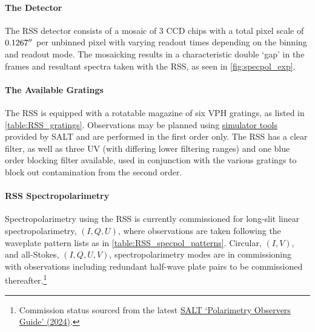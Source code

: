 \paragraph{The Detector}
The \gls{RSS} detector consists of a mosaic of 3 \gls{CCD} chips with a total pixel scale of $0.1267\hbox{$^{\prime\prime}$}$ per unbinned pixel with varying readout times depending on the binning and readout mode.
The mosaicking results in a characteristic double `gap' in the frames and resultant spectra taken with the \gls{RSS}, as seen in \autoref{fig:specpol_exp}.

\paragraph{The Available Gratings}
The \gls{RSS} is equipped with a rotatable magazine of six \gls{VPH} gratings, as listed in \autoref{table:RSS_gratings}.
Observations may be planned using \href{https://astronomers.salt.ac.za/software/}{simulator tools} provided by \gls{SALT} and are performed in the first order only.
The \gls{RSS} has a clear filter, as well as three \gls{UV} (with differing lower filtering ranges) and one blue order blocking filter available, used in conjunction with the various gratings to block out contamination from the second order.



\paragraph{\gls{RSS} Spectropolarimetry} \label{sec:RSS_reductions}

Spectropolarimetry using the \gls{RSS} is currently commissioned for long-slit linear spectro\-polarimetry, $(I, Q, U)$, where observations are taken following the waveplate pattern lists as in \autoref{table:RSS_specpol_patterns}.
Circular, $(I, V)$, and all-Stokes, $(I, Q, U, V)$, spectropolarimetry modes are in commissioning with observations including redundant half-wave plate pairs to be commissioned thereafter.\footnote{Commission status sourced from the latest \href{https://astronomers.salt.ac.za/wp-content/uploads/sites/71/2022/06/3170AM0013_Polarimetry_Observers_Guide_V1.2.pdf}{SALT `Polarimetry Observers Guide' (2024)}.}


